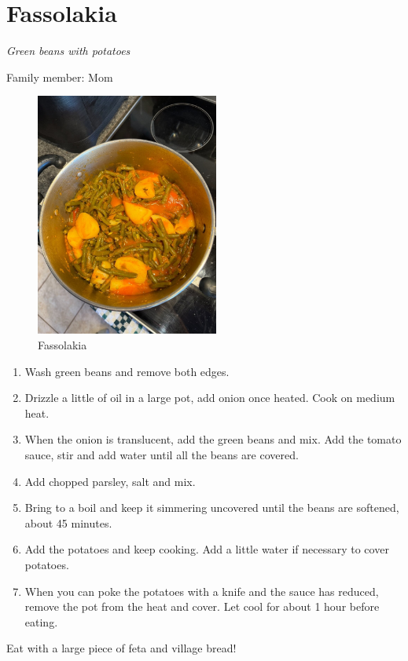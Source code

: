 \chapter{Fassolakia}
\label{ch:fakes}


\textit{Green beans with potatoes}

Family member: Mom

\begin{figure}
  \includegraphics[width=60mm]{monanteras/images/Green beans 1.jpg}
  \caption{Fassolakia}
\end{figure}

\begin{enumerate}
    \item Wash green beans and remove both edges.
    \item Drizzle a little of oil in a large pot, add onion once heated. Cook on medium heat.
    \item When the onion is translucent, add the green beans and mix. Add the tomato sauce, stir and add water until all the beans are covered.
    \item Add chopped parsley, salt and mix.
    \item Bring to a boil and keep it simmering uncovered until the beans are softened, about 45 minutes.
    \item Add the potatoes and keep cooking. Add a little water if necessary to cover potatoes.
    \item When you can poke the potatoes with a knife and the sauce has reduced, remove the pot from the heat and cover. Let cool for about 1 hour before eating.
\end{enumerate}

Eat with a large piece of feta and village bread!

